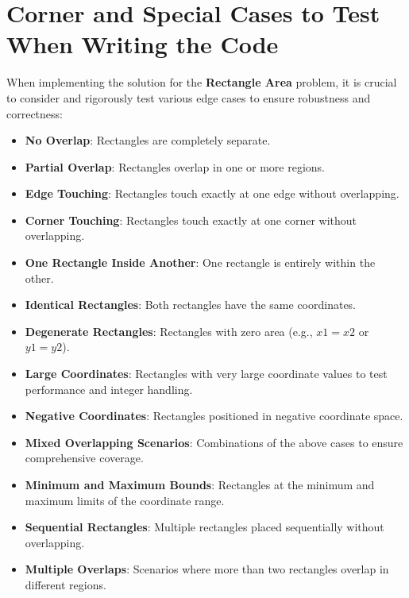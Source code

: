 \section*{Corner and Special Cases to Test When Writing the Code}

When implementing the solution for the \textbf{Rectangle Area} problem, it is crucial to consider and rigorously test various edge cases to ensure robustness and correctness:

\begin{itemize}
    \item \textbf{No Overlap}: Rectangles are completely separate.
    
    \item \textbf{Partial Overlap}: Rectangles overlap in one or more regions.
    
    \item \textbf{Edge Touching}: Rectangles touch exactly at one edge without overlapping.
    
    \item \textbf{Corner Touching}: Rectangles touch exactly at one corner without overlapping.
    
    \item \textbf{One Rectangle Inside Another}: One rectangle is entirely within the other.
    
    \item \textbf{Identical Rectangles}: Both rectangles have the same coordinates.
    
    \item \textbf{Degenerate Rectangles}: Rectangles with zero area (e.g., \(x1 = x2\) or \(y1 = y2\)).
    
    \item \textbf{Large Coordinates}: Rectangles with very large coordinate values to test performance and integer handling.
    
    \item \textbf{Negative Coordinates}: Rectangles positioned in negative coordinate space.
    
    \item \textbf{Mixed Overlapping Scenarios}: Combinations of the above cases to ensure comprehensive coverage.
    
    \item \textbf{Minimum and Maximum Bounds}: Rectangles at the minimum and maximum limits of the coordinate range.
    
    \item \textbf{Sequential Rectangles}: Multiple rectangles placed sequentially without overlapping.
    
    \item \textbf{Multiple Overlaps}: Scenarios where more than two rectangles overlap in different regions.
\end{itemize}

